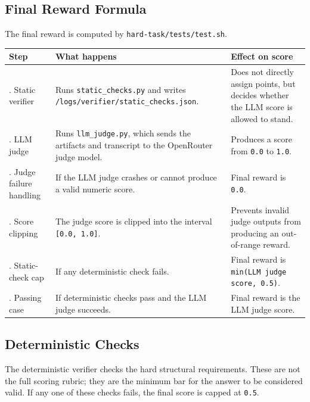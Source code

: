 \documentclass[11pt]{article}
\begin{document}
\subsection{Final Reward Formula}

The final reward is computed by \texttt{hard-task/tests/test.sh}.

\begin{center}
\scriptsize
\setlength{\tabcolsep}{4pt}
\begin{tabular}{|>{\raggedright\arraybackslash}p{1.35in}|>{\raggedright\arraybackslash}p{2.55in}|>{\raggedright\arraybackslash}p{2.15in}|}
\hline
Step & What happens & Effect on score \\
\hline
1. Static verifier & Runs \texttt{static\_checks.py} and writes
\texttt{/logs/verifier/static\_checks.json}. & Does not directly assign points,
but decides whether the LLM score is allowed to stand. \\
\hline
2. LLM judge & Runs \texttt{llm\_judge.py}, which sends the artifacts and
transcript to the OpenRouter judge model. & Produces a score from
\texttt{0.0} to \texttt{1.0}. \\
\hline
3. Judge failure handling & If the LLM judge crashes or cannot produce a valid
numeric score. & Final reward is \texttt{0.0}. \\
\hline
4. Score clipping & The judge score is clipped into the interval
\texttt{[0.0, 1.0]}. & Prevents invalid judge outputs from producing an
out-of-range reward. \\
\hline
5. Static-check cap & If any deterministic check fails. & Final reward is
\texttt{min(LLM judge score, 0.5)}. \\
\hline
6. Passing case & If deterministic checks pass and the LLM judge succeeds. &
Final reward is the LLM judge score. \\
\hline
\end{tabular}
\end{center}

\subsection{Deterministic Checks}

The deterministic verifier checks the hard structural requirements. These are
not the full scoring rubric; they are the minimum bar for the answer to be
considered valid. If any one of these checks fails, the final score is capped at
\texttt{0.5}.
\end{document}
